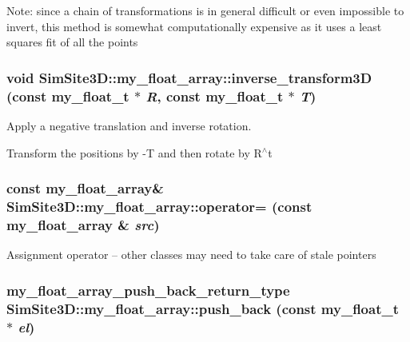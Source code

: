 Note: since a chain of transformations is in general difficult or even impossible to invert, this method is somewhat computationally expensive as it uses a least squares fit of all the points 
\subsubsection{\setlength{\rightskip}{0pt plus 5cm}void SimSite3D::my\_\-float\_\-array::inverse\_\-transform3D (const my\_\-float\_\-t $\ast$ {\em R}, const my\_\-float\_\-t $\ast$ {\em T})\hspace{0.3cm}{\tt  [inline]}}\label{classSimSite3D_1_1my__float__array_36cecd78c077ff31ded38a0194b862f2}


Apply a negative translation and inverse rotation. 

Transform the positions by -T and then rotate by R$^\wedge$t 
\subsubsection{\setlength{\rightskip}{0pt plus 5cm}const \bf{my\_\-float\_\-array}\& SimSite3D::my\_\-float\_\-array::operator= (const \bf{my\_\-float\_\-array} \& {\em src})\hspace{0.3cm}{\tt  [inline]}}\label{classSimSite3D_1_1my__float__array_cf2256fd42e02535450e38db5350b987}


Assignment operator -- other classes may need to take care of stale pointers 
\subsubsection{\setlength{\rightskip}{0pt plus 5cm}my\_\-float\_\-array\_\-push\_\-back\_\-return\_\-type SimSite3D::my\_\-float\_\-array::push\_\-back (const my\_\-float\_\-t $\ast$ {\em el})\hspace{0.3cm}{\tt  [inline]}}\label{classSimSite3D_1_1my__float__array_d1cf330a07c7789f5ef224cc93374277}


